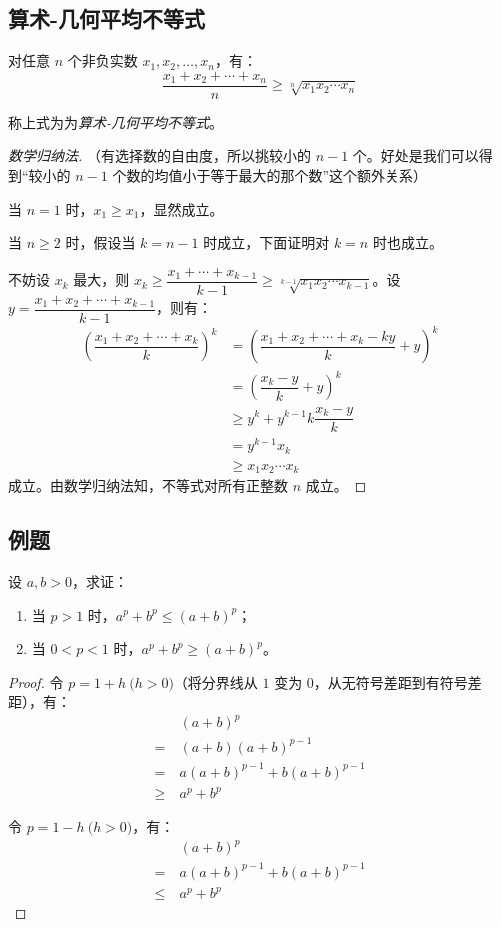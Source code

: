 \subsection{算术-几何平均不等式}

对任意 $n$ 个非负实数 $x_1, x_2, \ldots, x_n$，有：
$$
\dfrac{x_1 + x_2 + \cdots + x_n}{n} \ge \sqrt[n]{x_1 x_2 \cdots x_n}
$$

称上式为为\emph{算术-几何平均不等式}。

\begin{proof}[数学归纳法]
	（有选择数的自由度，所以挑较小的 $n - 1$ 个。好处是我们可以得到“较小的 $n - 1$ 个数的均值小于等于最大的那个数”这个额外关系）

	当 $n = 1$ 时，$x_1 \ge x_1$，显然成立。

	当 $n \ge 2$ 时，假设当 $k = n - 1$ 时成立，下面证明对 $k = n$ 时也成立。

	不妨设 $x_k$ 最大，则 $x_k \ge \dfrac{x_1 + \cdots + x_{k - 1}}{k - 1} \ge \sqrt[k - 1]{x_1 x_2 \cdots x_{k - 1}}$。设 $y = \dfrac{x_1 + x_2 + \cdots + x_{k - 1}}{k - 1}$，则有：
	$$
	\begin{aligned}
		\left( \dfrac{x_1 + x_2 + \cdots + x_k}{k} \right)^k &= \left( \dfrac{x_1 + x_2 + \cdots + x_k - ky}{k} + y \right)^k
		\\&=
		\left( \dfrac{x_k - y}{k} + y \right)^k
		\\&\ge
		y^k + y^{k - 1} k \dfrac{x_k - y}{k}
		\\&=
		y^{k - 1} x_k
		\\&\ge
		x_1 x_2 \cdots x_k
	\end{aligned}
	$$
	成立。由数学归纳法知，不等式对所有正整数 $n$ 成立。
\end{proof}

\subsection{例题}

设 $a, b > 0$，求证：
\begin{enumerate}
	\item 当 $p > 1$ 时，$a^p + b^p \le (a + b)^p$；
	\item 当 $0 < p < 1$ 时，$a^p + b^p \ge (a + b)^p$。
\end{enumerate}

\begin{proof}
	令 $p = 1 + h \pod{h > 0}$（将分界线从 $1$ 变为 $0$，从无符号差距到有符号差距），有：
	$$
	\begin{aligned}&
		(a + b)^p
		\\=~&
		(a + b)(a + b)^{p - 1}
		\\=~&
		a (a + b)^{p - 1} + b (a + b)^{p - 1}
		\\\ge~&
		a^p + b^p
	\end{aligned}
	$$

	令 $p = 1 - h \pod{h > 0}$，有：
	$$
	\begin{aligned}&
		(a + b)^p
		\\=~&
		a (a + b)^{p - 1} + b (a + b)^{p - 1}
		\\\le~&
		a^p + b^p
	\end{aligned}
	$$
\end{proof}

